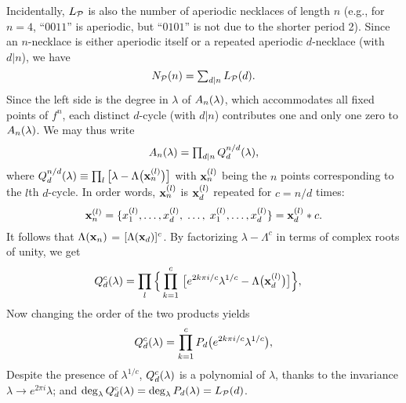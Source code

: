 \documentclass{ws-ijbc}
\begin{document}
Incidentally, $L_\mathcal P$ is also the number of aperiodic necklaces of length $n$
(e.g., for $n = 4$,
  ``$0011$'' is aperiodic, but ``$0101$'' is not due to the shorter period 2).
%
Since an $n$-necklace is either aperiodic itself or
  a repeated aperiodic $d$-necklace (with $d|n$),
  we have
\begin{equation}
  N_\mathcal P(n) = \textstyle\sum_{d|n} L_\mathcal P(d).
\label{eq:necklacelyndon}
\end{equation}
%
Since the left side is the degree in $\lambda$ of $A_n(\lambda)$,
  which accommodates all fixed points of $f^n$,
  each distinct $d$-cycle (with $d|n$)
  contributes one and only one zero to $A_n(\lambda)$.
%
%
We may thus write
  \begin{equation}
    A_n(\lambda) = \textstyle\prod_{d|n} Q_d^{n/d}(\lambda),
    \label{eq:prod}
  \end{equation}
where $Q_d^{n/d}(\lambda) \equiv \prod_l
  \big[\lambda - \Lambda\big(\mathbf{x}_{n}^{(l)}\big) \big]$
  with $\mathbf{x}_{n}^{(l)}$ being the $n$ points
  corresponding to the $l$th $d$-cycle.
%
In order words, $\mathbf{x}_{n}^{(l)}$ is $\mathbf{x}_{d}^{(l)}$
  repeated for $c = n/d$ times:
\begin{equation}
  \mathbf{x}_{n}^{(l)} =
  \{
    x_1^{(l)}, \ldots, x_d^{(l)},
    \; \ldots, \;
    x_1^{(l)}, \ldots, x_d^{(l)}
  \}
  = \mathbf{x}_{d}^{(l)} * c.
\notag
\end{equation}
%
It follows that
$\Lambda(\mathbf{x}_{n})$ = $[\Lambda(\mathbf{x}_{d})]^c$.
By factorizing $\lambda - \Lambda^c$
  in terms of complex roots of unity, we get
\begin{align}
Q_d^{c}(\lambda)
  &=
    \prod_l
    \Big\{
      \prod_{k=1}^c \,
      \big[
          e^{2k\pi i/c} \lambda^{1/c}
          - \Lambda\big(\mathbf{x}_{d}^{(l)}\big)
      \big]
    \Big\},
    \notag
\end{align}
%
Now changing the order of the two products yields
\begin{equation}
Q_d^{c}(\lambda)
  =  \prod_{k=1}^c P_d\big(e^{2k\pi i/c} \lambda^{1/c}\big),
\label{eq:QP}
\end{equation}
%
%
Despite the presence of $\lambda^{1/c}$,
  $Q_d^c(\lambda)$ is a polynomial of $\lambda$,
  thanks to the invariance
  $\lambda \rightarrow e^{2\pi i} \lambda$;
and
  $\deg_\lambda Q_d^c(\lambda)
    = \deg_\lambda P_d(\lambda) = L_\mathcal P(d)$.
\end{document}
